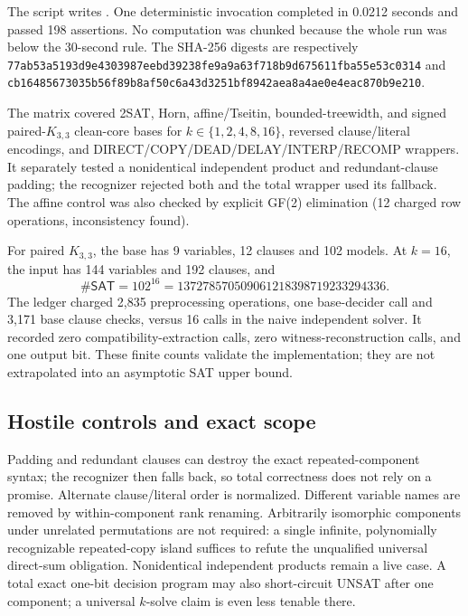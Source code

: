 \documentclass[11pt]{article}
\newcommand{\SAT}{\mathsf{SAT}}
\begin{document}
The script
writes
.
One deterministic invocation completed in 0.0212 seconds and passed 198
assertions.  No computation was chunked because the whole run was below the
30-second rule.  The SHA-256 digests are respectively
\texttt{77ab53a5193d9e4303987eebd39238fe9a9a63f718b9d675611fba55e53c0314}
and
\texttt{cb16485673035b56f89b8af50c6a43d3251bf8942aea8a4ae0e4eac870b9e210}.

The matrix covered 2SAT, Horn, affine/Tseitin, bounded-treewidth, and signed
paired-\(K_{3,3}\) clean-core bases for \(k\in\{1,2,4,8,16\}\), reversed
clause/literal encodings, and DIRECT/COPY/DEAD/DELAY/INTERP/RECOMP wrappers.
It separately tested a nonidentical independent product and redundant-clause
padding; the recognizer rejected both and the total wrapper used its fallback.
The affine control was also checked by explicit GF(2) elimination (12 charged
row operations, inconsistency found).

For paired \(K_{3,3}\), the base has 9 variables, 12 clauses and 102 models.
At \(k=16\), the input has 144 variables and 192 clauses, and
\[
 \#\SAT=102^{16}=137278570509061218398719233294336.
\]
The ledger charged 2,835 preprocessing operations, one base-decider call and
3,171 base clause checks, versus 16 calls in the naive independent solver.  It
recorded zero compatibility-extraction calls, zero witness-reconstruction
calls, and one output bit.  These finite counts validate the implementation;
they are not extrapolated into an asymptotic SAT upper bound.

\subsection*{Hostile controls and exact scope}

Padding and redundant clauses can destroy the exact repeated-component syntax;
the recognizer then falls back, so total correctness does not rely on a
promise.  Alternate clause/literal order is normalized.  Different variable
names are removed by within-component rank renaming.  Arbitrarily isomorphic
components under unrelated permutations are not required: a single infinite,
polynomially recognizable repeated-copy island suffices to refute the
unqualified universal direct-sum obligation.  Nonidentical independent
products remain a live case.  A total exact one-bit decision program may also
short-circuit UNSAT after one component; a universal \(k\)-solve claim is even
less tenable there.
\end{document}
